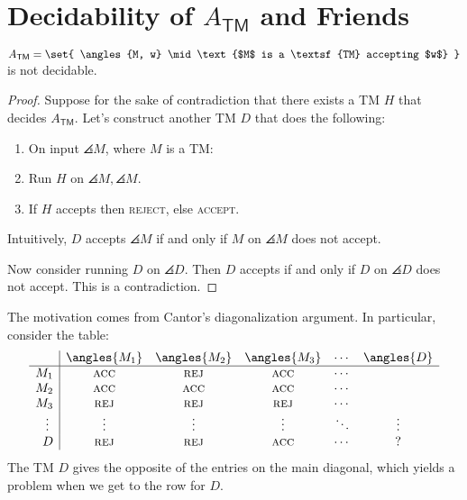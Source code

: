 \documentclass{standalone}
\begin{document}
\section{Decidability of \texorpdfstring{\(A_{\textsf{TM}}\)}{A\_TM} and Friends}
\begin{theorem}
  \(A_{\textsf{TM}} = \set{
    \angles{M, w} \mid
    \text{$M$ is a \textsf{TM} accepting $w$}
  }\) is not decidable.
\end{theorem}
\begin{proof}
  Suppose for the sake of contradiction that there exists
  a \textsf{TM} \(H\) that decides \(A_{\textsf{TM}}\).
  Let's construct another \textsf{TM} \(D\) that does the following:
  \begin{enumerate}[start=0]
    \item On input \(\angles{M}\), where \(M\) is a \textsf{TM}:
    \item Run \(H\) on \(\angles{M, \angles{M}}\).
    \item If \(H\) accepts then \textsc{reject}, else \textsc{accept}.
  \end{enumerate}
  
  Intuitively, \(D\) accepts \(\angles{M}\) if and only if
  \(M\) on \(\angles M\) does not accept.

  Now consider running \(D\) on \(\angles{D}\).
  Then \(D\) accepts if and only if \(D\) on \(\angles{D}\) does not accept.
  This is a contradiction.
\end{proof}

The motivation comes from Cantor's diagonalization argument.
In particular, consider the table:
\[
  \begin{array}{r | c c c c c} %
        & \angles{M_1} & \angles{M_2} & \angles{M_3} & \cdots & \angles{D} \\ \hline %
    M_1 & \textsc{acc} & \textsc{rej} & \textsc{acc} & \cdots & \\
    M_2 & \textsc{acc} & \textsc{acc} & \textsc{acc} & \cdots & \\
    M_3 & \textsc{rej} & \textsc{rej} & \textsc{rej} & \cdots & \\
    \vdots\,\, & \vdots & \vdots & \vdots & \ddots & \vdots \\
    D & \textsc{rej} & \textsc{rej} & \textsc{acc} & \cdots & ? \\
  \end{array}
\]
The \textsf{TM} \(D\) gives the opposite of the entries on the main diagonal,
which yields a problem when we get to the row for \(D\).
\end{document}
